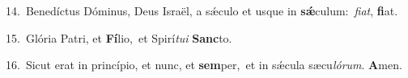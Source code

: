 {\numbfont\textcolor{\numbcolor}{14.}}~Benedíctus Dóminus, Deus Israël, a sǽculo et usque in \textbf{sǽ}\-culum:~\star \textit{fi}\-\textit{at}, \textbf{fi}\-at.\par
{\numbfont\textcolor{\numbcolor}{15.}}~Glória Patri, et \textbf{Fí}\-lio,~\star et Spirí\-\textit{tu}\-\textit{i} \textbf{Sanc}\-to.\par
{\numbfont\textcolor{\numbcolor}{16.}}~Sicut erat in princípio, et nunc, et \textbf{sem}\-per,~\star et in sǽcula sæcu\-\textit{ló}\-\textit{rum}. \textbf{A}\-men.\par

